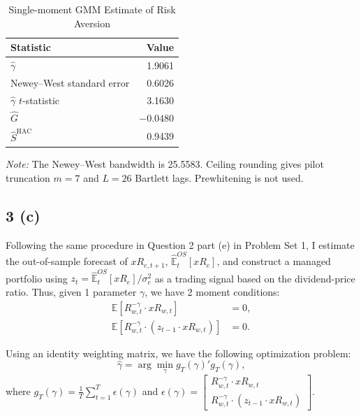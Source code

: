 \documentclass[11pt]{article}
\begin{document}
\begin{table}[H]
  \centering
  \caption{Single-moment GMM Estimate of Risk Aversion}
  \label{tab:3b-gmm}

  \begin{minipage}{0.75\textwidth}
    \centering
    \begin{tabular*}{\linewidth}{@{\extracolsep{\fill}}lr@{}}
      \toprule
      Statistic & Value \\
      \midrule
      $\hat{\gamma}$ & 1.9061 \\
      Newey--West standard error & 0.6026 \\
      $\hat{\gamma}$ $t$-statistic & 3.1630 \\
      $\hat{G}$ & $-0.0480$ \\
      $\hat{S}^{\mathrm{HAC}}$ & 0.9439 \\
      \bottomrule
    \end{tabular*}

    \par\smallskip
    {\footnotesize\raggedright
      \textit{Note:} The Newey--West bandwidth is 25.5583.
      Ceiling rounding gives pilot truncation $m=7$ and
      $L=26$ Bartlett lags. Prewhitening is not used.
      \par}
  \end{minipage}
\end{table}

\subsection*{3 (c)}
Following the same procedure in Question 2 part (e) in Problem Set 1, I estimate the out-of-sample
forecast of $xR_{e,t+1}$, $\hat{\mathbb{E}}_{t}^{OS}[xR_e]$, and construct a managed portfolio 
using $z_t = \hat{\mathbb{E}}_{t}^{OS}[xR_e]/ \sigma_{e}^{2}$ as a trading signal based on the dividend-price ratio. 
Thus, given 1 parameter $\gamma$, we have 2 moment conditions:
\begin{align*}
    \mathbb{E}\!\left[
      R_{w,t}^{-\gamma} \cdot xR_{w,t}
    \right] &= 0, \\
    \mathbb{E}\!\left[
      R_{w,t}^{-\gamma} \cdot (z_{t-1} \cdot xR_{w,t})
    \right] &= 0.
\end{align*}

Using an identity weighting matrix, we have the following optimization problem:
\[
    \hat{\gamma} = \arg\min_{\gamma} g_{T}(\gamma)'g_{T}(\gamma),
\]      
where $g_{T}(\gamma) = \frac{1}{T}\sum_{t=1}^{T} \epsilon(\gamma)$ and $\epsilon(\gamma) = \begin{bmatrix}
R_{w,t}^{-\gamma} \cdot xR_{w,t} \\
R_{w,t}^{-\gamma} \cdot (z_{t-1} \cdot xR_{w,t})
\end{bmatrix}$.
\end{document}
